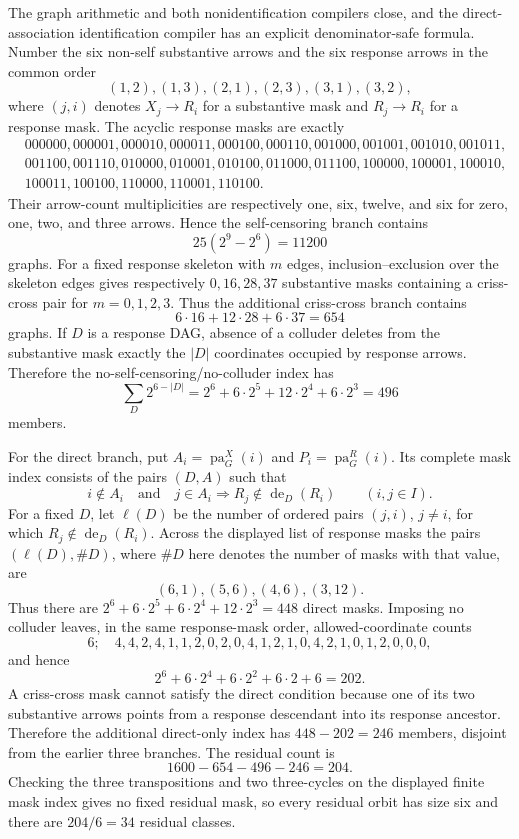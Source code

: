 The graph arithmetic and both nonidentification compilers close, and the direct-association identification compiler has an explicit denominator-safe formula. Number the six non-self substantive arrows and the six response arrows in the common order
\[
(1,2),(1,3),(2,1),(2,3),(3,1),(3,2),
\]
where \((j,i)\) denotes \(X_j\to R_i\) for a substantive mask and \(R_j\to R_i\) for a response mask. The acyclic response masks are exactly
\[
\begin{split}
&000000,000001,000010,000011,000100,000110,001000,001001,001010,001011,\\
&001100,001110,010000,010001,010100,011000,011100,100000,100001,100010,\\
&100011,100100,110000,110001,110100.
\end{split}
\]
Their arrow-count multiplicities are respectively one, six, twelve, and six for zero, one, two, and three arrows. Hence the self-censoring branch contains
\[
25(2^9-2^6)=11200
\]
graphs. For a fixed response skeleton with \(m\) edges, inclusion--exclusion over the skeleton edges gives respectively \(0,16,28,37\) substantive masks containing a criss-cross pair for \(m=0,1,2,3\). Thus the additional criss-cross branch contains
\[
6\cdot16+12\cdot28+6\cdot37=654
\]
graphs. If \(D\) is a response DAG, absence of a colluder deletes from the substantive mask exactly the \(|D|\) coordinates occupied by response arrows. Therefore the no-self-censoring/no-colluder index has
\[
\sum_D2^{6-|D|}=2^6+6\cdot2^5+12\cdot2^4+6\cdot2^3=496
\]
members.

For the direct branch, put \(A_i=\operatorname{pa}^{X}_{G}(i)\) and \(P_i=\operatorname{pa}^{R}_{G}(i)\). Its complete mask index consists of the pairs \((D,A)\) such that
\[
i\notin A_i
\quad\text{and}\quad
j\in A_i\Longrightarrow R_j\notin\operatorname{de}_{D}(R_i)
\qquad(i,j\in I).
\]
For a fixed \(D\), let \(\ell(D)\) be the number of ordered pairs \((j,i)\), \(j\ne i\), for which \(R_j\notin\operatorname{de}_{D}(R_i)\). Across the displayed list of response masks the pairs \((\ell(D),\#D)\), where \(\#D\) here denotes the number of masks with that value, are
\[
(6,1),(5,6),(4,6),(3,12).
\]
Thus there are \(2^6+6\cdot2^5+6\cdot2^4+12\cdot2^3=448\) direct masks. Imposing no colluder leaves, in the same response-mask order, allowed-coordinate counts
\[
6;\quad 4,4,2,4,1,1,2,0,2,0,4,1,2,1,0,4,2,1,0,1,2,0,0,0,
\]
and hence
\[
2^6+6\cdot2^4+6\cdot2^2+6\cdot2+6=202.
\]
A criss-cross mask cannot satisfy the direct condition because one of its two substantive arrows points from a response descendant into its response ancestor. Therefore the additional direct-only index has \(448-202=246\) members, disjoint from the earlier three branches. The residual count is
\[
1600-654-496-246=204.
\]
Checking the three transpositions and two three-cycles on the displayed finite mask index gives no fixed residual mask, so every residual orbit has size six and there are \(204/6=34\) residual classes.

